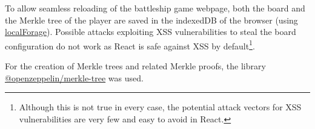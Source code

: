 To allow seamless reloading of the battleship game webpage, both the board and
the Merkle tree of the player are saved in the indexedDB of the browser (using
\href{https://github.com/localForage/localForage}{\color{blue}localForage}).
Possible attacks exploiting XSS vulnerabilities to steal the board
configuration do not work as React is safe against XSS by
default\footnote{Although this is not true in every case, the potential attack
	vectors for XSS vulnerabilities are very few and easy to avoid in React.}.

For the creation of Merkle trees and related Merkle proofs, the library
\href{https://github.com/OpenZeppelin/merkle-tree}{\color{blue}@openzeppelin/merkle-tree}
was used.

